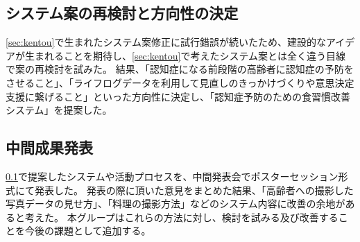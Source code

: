 \documentclass[../report]{subfiles}
\begin{document}
\subsection{システム案の再検討と方向性の決定}\label{sec:saikentou}
\ref{sec:kentou}で生まれたシステム案修正に試行錯誤が続いたため、建設的なアイデアが生まれることを期待し、\ref{sec:kentou}で考えたシステム案とは全く違う目線で案の再検討を試みた。
結果、「認知症になる前段階の高齢者に認知症の予防をさせること」、「ライフログデータを利用して見直しのきっかけづくりや意思決定支援に繋げること」といった方向性に決定し、「認知症予防のための食習慣改善システム」を提案した。

\subsection{中間成果発表}
\ref{sec:saikentou}で提案したシステムや活動プロセスを、中間発表会でポスターセッション形式にて発表した。
発表の際に頂いた意見をまとめた結果、「高齢者への撮影した写真データの見せ方」、「料理の撮影方法」などのシステム内容に改善の余地があると考えた。
本グループはこれらの方法に対し、検討を試みる及び改善することを今後の課題として追加する。
\end{document}
